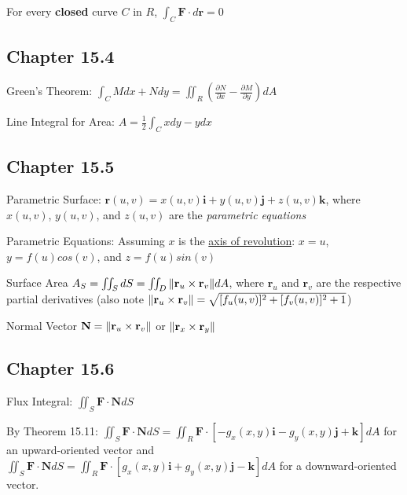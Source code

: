 \documentclass{article}
\begin{document}
\par\noindent\Large For every \textbf{closed} curve $C$ in $R$, $\int_{C}\textbf{F}\cdot d\textbf{r} = 0$

\subsection{Chapter 15.4}
\par\noindent\Large Green's Theorem: $\int_{C}Mdx + Ndy = \iint_{R}(\frac{\partial N}{\partial x} - \frac{\partial M}{\partial y})dA$

\par\noindent\Large Line Integral for Area: $A = \frac{1}{2}\int_{C}xdy - ydx$

\subsection{Chapter 15.5}
\par\noindent\Large Parametric Surface: $\textbf{r}(u, v) = x(u, v)\textbf{i} + y(u, v)\textbf{j} + z(u, v)\textbf{k}$, where $x(u, v)$, $y(u, v)$, and $z(u, v)$ are the \textit{parametric equations}
\par\noindent\Large Parametric Equations: Assuming $x$ is the \underline{axis of revolution}: $x = u$, $y = f(u)cos(v)$, and $z = f(u)sin(v)$
\par\noindent\Large Surface Area $A_{S} = \iint_{S}dS = \iint_{D}\norm{\textbf{r}_{u} \times \textbf{r}_{v}}dA$, where $\textbf{r}_{u}$ and $\textbf{r}_{v}$ are the respective partial derivatives (also note $\norm{\textbf{r}_{u} \times \textbf{r}_{v}} = \sqrt{[f_{u}(u, v)]^{2} + [f_{v}(u, v)]^{2} + 1}$)
\par\noindent\Large Normal Vector $\textbf{N} = \norm{\textbf{r}_{u}\times\textbf{r}_{v}}$ or $\norm{\textbf{r}_{x}\times\textbf{r}_{y}}$

\subsection{Chapter 15.6}
\par\noindent\Large Flux Integral: $\iint_{S}\textbf{F}\cdot\textbf{N}dS$
\par\noindent\Large By Theorem 15.11: $\iint_{S}\textbf{F}\cdot\textbf{N}dS = \iint_{R}\textbf{F}\cdot [-g_{x}(x, y)\textbf{i} - g_{y}(x, y)\textbf{j} + \textbf{k}]dA$ for an upward-oriented vector and $\iint_{S}\textbf{F}\cdot\textbf{N}dS = \iint_{R}\textbf{F}\cdot [g_{x}(x, y)\textbf{i} + g_{y}(x, y)\textbf{j} - \textbf{k}]dA$ for a downward-oriented vector.
\end{document}
